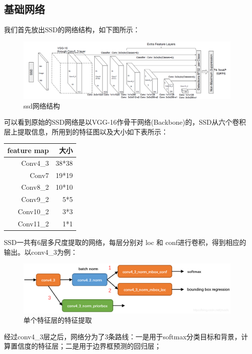 \subsection{基础网络}
\par
我们首先放出SSD的网络结构，如下图所示：
\begin{figure}[htbp]
	\includegraphics[width=1\textwidth]{figures/ssdnet.png}
	\setlength{\abovecaptionskip}{0cm}  
	\setlength{\belowcaptionskip}{0cm}  
	\caption{ssd网络结构}
\end{figure}
\par
可以看到原始的SSD网络是以VGG-16作骨干网络(Backbone)的，SSD从六个卷积层上提取信息，所用到的特征图以及大小如下表所示：
\par
{
\begin{center}
\begin{tabular}{|rr|}
	\hline
	feature map & 大小\\
	\hline
	Conv4\_3 & 38*38\\
	Conv7 & 19*19\\
	Conv8\_2 & 10*10\\
	Conv9\_2 & 5*5\\
	Conv10\_2 & 3*3\\
	Conv11\_2 & 1*1\\
	\hline
\end{tabular}
\end{center}
}
\par
SSD一共有6层多尺度提取的网络，每层分别对 loc 和 conf进行卷积，得到相应的输出。以conv4\_3为例：
\begin{figure}[!ht]
	\centering
	\includegraphics[width=1\textwidth]{figures/conv43.png}
	\caption{单个特征层的特征提取}
\end{figure}
\par
经过conv4\_3层之后，网络分为了3条路线：一是用于softmax分类目标和背景，计算置信度的特征层；二是用于边界框预测的回归层；

